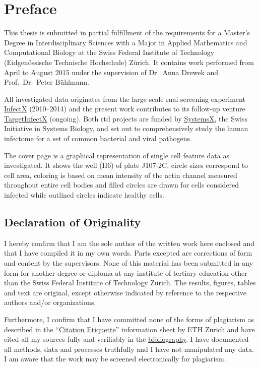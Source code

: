 \chapter{Preface}

This thesis is submitted in partial fulfillment of the requirements for a Master's Degree in Interdisciplinary Sciences with a Major in Applied Mathematics and Computational Biology at the Swiss Federal Institute of Technology (Eidgenössische Technische Hochschule) Z\"urich. It contains work performed from April to August 2015 under the supervision of Dr.\ Anna Drewek and Prof.\ Dr.\ Peter B\"uhlmann.

All investigated data originates from the large-scale \acrfull{rnai} screening experiment \href{http://www.infectx.ch}{InfectX} (2010--2014) and the present work contributes to its follow-up venture \href{http://www.targetinfectx.ch}{TargetInfectX} (ongoing). Both \acrfull{rtd} projects are funded by \href{http://www.systemsx.ch}{SystemsX}, the Swiss Initiative in Systems Biology, and set out to comprehensively study the human infectome for a set of common bacterial and viral pathogens.

The cover page is a graphical representation of single cell feature data as investigated. It shows the  well (H6) of plate J107-2C, circle sizes correspond to cell area, coloring is based on mean intensity of the actin channel measured throughout entire cell bodies and filled circles are drawn for cells considered infected while outlined circles indicate healthy cells.

\section*{Declaration of Originality}

I hereby confirm that I am the sole author of the written work here enclosed and that I have compiled it in my own words. Parts excepted are corrections of form and content by the supervisors. None of this material has been submitted in any form for another degree or diploma at any institute of tertiary education other than the Swiss Federal Institute of Technology Z\"urich. The results, figures, tables and text are original, except otherwise indicated by reference to the respective authors and/or organizations.

Furthermore, I confirm that I have committed none of the forms of plagiarism as described in the ``\href{https://www.ethz.ch/content/dam/ethz/main/education/rechtliches-abschluesse/leistungskontrollen/plagiarism-citationetiquette.pdf}{Citation Etiquette}'' information sheet by ETH Z\"urich and have cited all my sources fully and verifiably in the \hyperref[ch:bibliography]{bibliography}. I have documented all methods, data and processes truthfully and I have not manipulated any data. I am aware that the work may be screened electronically for plagiarism.

